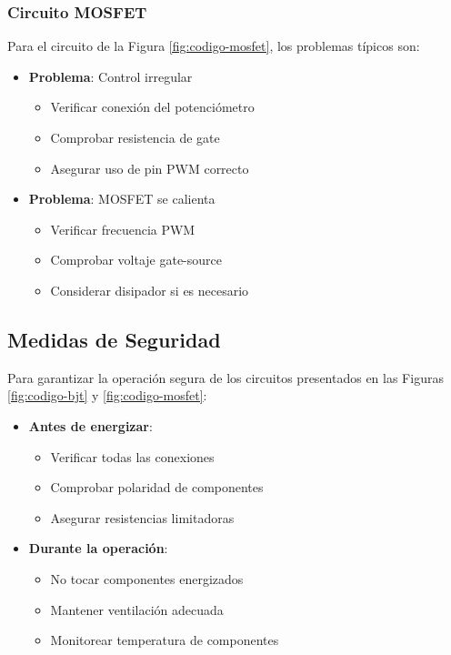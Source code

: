 \subsubsection{Circuito MOSFET}
Para el circuito de la Figura \ref{fig:codigo-mosfet}, los problemas típicos son:
\begin{itemize}
	\item \textbf{Problema}: Control irregular
	\begin{itemize}
		\item Verificar conexi\'on del potenci\'ometro
		\item Comprobar resistencia de gate
		\item Asegurar uso de pin PWM correcto
	\end{itemize}
	
	\item \textbf{Problema}: MOSFET se calienta
	\begin{itemize}
		\item Verificar frecuencia PWM
		\item Comprobar voltaje gate-source
		\item Considerar disipador si es necesario
	\end{itemize}
\end{itemize}

\subsection{Medidas de Seguridad}
Para garantizar la operación segura de los circuitos presentados en las Figuras \ref{fig:codigo-bjt} y \ref{fig:codigo-mosfet}:

\begin{itemize}
	\item \textbf{Antes de energizar}:
	\begin{itemize}
		\item Verificar todas las conexiones
		\item Comprobar polaridad de componentes
		\item Asegurar resistencias limitadoras
	\end{itemize}
	
	\item \textbf{Durante la operaci\'on}:
	\begin{itemize}
		\item No tocar componentes energizados
		\item Mantener ventilaci\'on adecuada
		\item Monitorear temperatura de componentes
	\end{itemize}
\end{itemize}